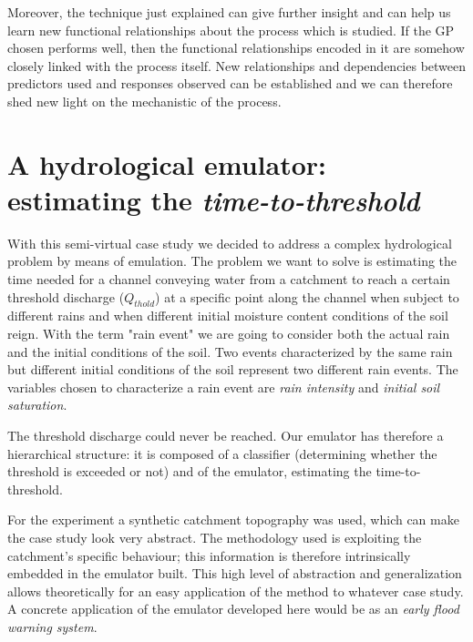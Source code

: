 Moreover, the technique just explained can give further insight and can help us learn new functional relationships about the process which is studied.
If the GP chosen performs well, then the functional relationships encoded in it are somehow closely linked with the process itself.
New relationships and dependencies between predictors used and responses observed can be established and we can therefore shed new light on the mechanistic of the process.


\newpage

\section{A hydrological emulator: estimating the \textit{time-to-threshold}}
\label{sec:hydrological_emulator}




With this semi-virtual case study we decided to address a complex hydrological problem by means of emulation.
The problem we want to solve is estimating the time needed for a channel conveying water from a catchment to reach a certain threshold discharge ($Q_{thold}$) at a specific point along the channel when subject to different rains and when different initial moisture content conditions of the soil reign.
With the term "rain event" we are going to consider both the actual rain and the initial conditions of the soil.
Two events characterized by the same rain but different initial conditions of the soil represent two different rain events. The variables chosen to characterize a rain event are \emph{rain intensity} and \emph{initial soil saturation}.

The threshold discharge could never be reached.
Our emulator has therefore a hierarchical structure: it is composed of a classifier (determining whether the threshold is exceeded or not) and of the emulator, estimating the time-to-threshold.

For the experiment a synthetic catchment topography was used, which can make the case study look very abstract.
The methodology used is exploiting the catchment's specific behaviour; this information is therefore intrinsically embedded in the emulator built.
This high level of abstraction and generalization allows theoretically for an easy application of the method to whatever case study.
A concrete application of the emulator developed here would be as an \emph{early flood warning system}.



